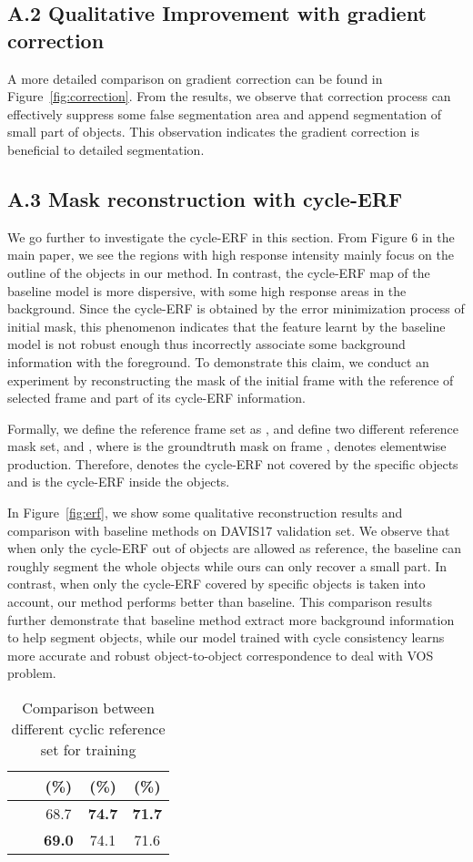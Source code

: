 \documentclass{article}
\begin{document}
\subsection*{A.2 Qualitative Improvement with gradient correction}
A more detailed comparison on gradient correction can be found in Figure~\ref{fig:correction}. From the results, we observe that correction process can effectively suppress some false segmentation area and append segmentation of small part of objects. This observation indicates the gradient correction is beneficial to detailed segmentation.

\subsection*{A.3 Mask reconstruction with cycle-ERF}

We go further to investigate the cycle-ERF in this section. From Figure 6 in the main paper, we see the regions with high response intensity mainly focus on the outline of the objects in our method. In contrast, the cycle-ERF map of the baseline model is more dispersive, with some high response areas in the background. Since the cycle-ERF is obtained by the error minimization process of initial mask, this phenomenon indicates that the feature learnt by the baseline model is not robust enough thus incorrectly associate some background information with the foreground. To demonstrate this claim, we conduct an experiment by reconstructing the mask of the initial frame with the reference of selected frame and part of its cycle-ERF information.

Formally, we define the reference frame set as , and define two different reference mask set,  and , where  is the groundtruth mask on frame ,  denotes elementwise production. Therefore,  denotes the cycle-ERF not covered by the specific objects and   is the cycle-ERF inside the objects.

In Figure~\ref{fig:erf}, we show some qualitative reconstruction results and comparison with baseline methods on DAVIS17 validation set. We observe that when only the cycle-ERF out of objects are allowed as reference, the baseline can roughly segment the whole objects while ours can only recover a small part. In contrast, when only the cycle-ERF covered by specific objects is taken into account, our method performs better than baseline. This comparison results further demonstrate that baseline method extract more background information to help segment objects, while our model trained with cycle consistency learns more accurate and robust object-to-object correspondence to deal with VOS problem.
\begin{table}
    \centering
    \begin{tabular}{c|c|ccc}\hline
         &  & (\%) & (\%) & (\%) \\\hline
         &  & 68.7 & \textbf{74.7} & \textbf{71.7} \\
         &  & \textbf{69.0} & 74.1 & 71.6 \\\hline
    \end{tabular}
    \caption{Comparison between different cyclic reference set for training}
    \label{tab:cyclic}
\end{table}
\end{document}
